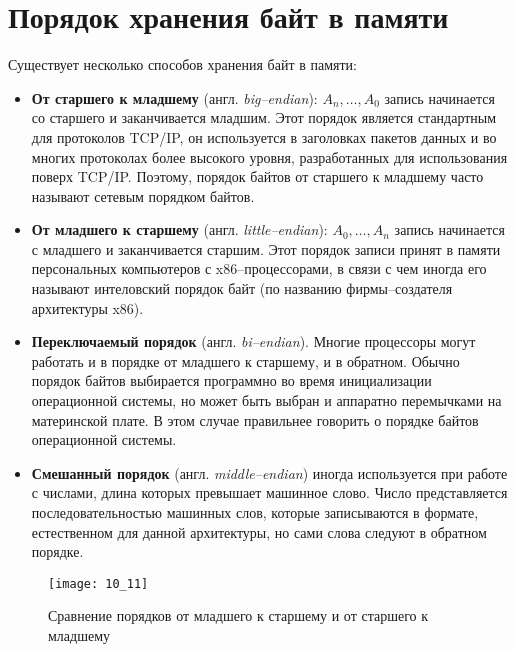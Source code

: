 \section{Порядок хранения байт в памяти}
Существует несколько способов хранения байт в памяти:
\begin{itemize}
  \item \textbf{От старшего к младшему} (англ. \emph{big--endian}): $A_n,\dots,A_0$ запись начинается со старшего и заканчивается младшим. Этот порядок является стандартным для протоколов TCP/IP, он используется в заголовках пакетов данных и во многих протоколах более высокого уровня, разработанных для использования поверх TCP/IP. Поэтому, порядок байтов от старшего к младшему часто называют сетевым порядком байтов.
  \item \textbf{От младшего к старшему} (англ. \emph{little--endian}): $A_0,\dots,A_n$ запись начинается с младшего и заканчивается старшим. Этот порядок записи принят в памяти персональных компьютеров с x86--процессорами, в связи с чем иногда его называют интеловский порядок байт (по названию фирмы--создателя архитектуры x86).
  \item \textbf{Переключаемый порядок} (англ. \emph{bi--endian}). Многие процессоры могут работать и в порядке от младшего к старшему, и в обратном. Обычно порядок байтов выбирается программно во время инициализации операционной системы, но может быть выбран и аппаратно перемычками на материнской плате. В этом случае правильнее говорить о порядке байтов операционной системы.
  \item \textbf{Смешанный порядок} (англ. \emph{middle--endian}) иногда используется при работе с числами, длина которых превышает машинное слово. Число представляется последовательностью машинных слов, которые записываются в формате, естественном для данной архитектуры, но сами слова следуют в обратном порядке.
\end{itemize}
\begin{figure}[h]
\texttt{[image: 10\_11]}
\caption{Сравнение порядков от младшего к старшему и от старшего к младшему}
\end{figure}
